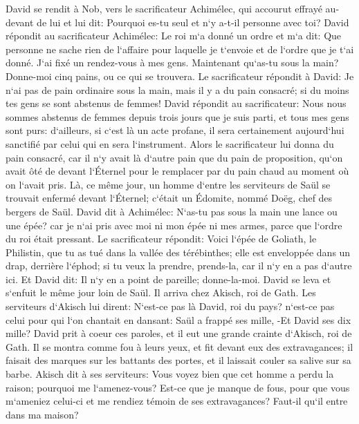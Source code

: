 \verse David se rendit à Nob, vers le sacrificateur Achimélec, qui accourut effrayé au-devant de lui et lui dit: Pourquoi es-tu seul et n`y a-t-il personne avec toi? 
\verse David répondit au sacrificateur Achimélec: Le roi m`a donné un ordre et m`a dit: Que personne ne sache rien de l`affaire pour laquelle je t`envoie et de l`ordre que je t`ai donné. J`ai fixé un rendez-vous à mes gens. 
\verse Maintenant qu`as-tu sous la main? Donne-moi cinq pains, ou ce qui se trouvera. 
\verse Le sacrificateur répondit à David: Je n`ai pas de pain ordinaire sous la main, mais il y a du pain consacré; si du moins tes gens se sont abstenus de femmes! 
\verse David répondit au sacrificateur: Nous nous sommes abstenus de femmes depuis trois jours que je suis parti, et tous mes gens sont purs: d`ailleurs, si c`est là un acte profane, il sera certainement aujourd`hui sanctifié par celui qui en sera l`instrument. 
\verse Alors le sacrificateur lui donna du pain consacré, car il n`y avait là d`autre pain que du pain de proposition, qu`on avait ôté de devant l`Éternel pour le remplacer par du pain chaud au moment où on l`avait pris. 
\verse Là, ce même jour, un homme d`entre les serviteurs de Saül se trouvait enfermé devant l`Éternel; c`était un Édomite, nommé Doëg, chef des bergers de Saül. 
\verse David dit à Achimélec: N`as-tu pas sous la main une lance ou une épée? car je n`ai pris avec moi ni mon épée ni mes armes, parce que l`ordre du roi était pressant. 
\verse Le sacrificateur répondit: Voici l`épée de Goliath, le Philistin, que tu as tué dans la vallée des térébinthes; elle est enveloppée dans un drap, derrière l`éphod; si tu veux la prendre, prends-la, car il n`y en a pas d`autre ici. Et David dit: Il n`y en a point de pareille; donne-la-moi. 
\verse David se leva et s`enfuit le même jour loin de Saül. Il arriva chez Akisch, roi de Gath. 
\verse Les serviteurs d`Akisch lui dirent: N`est-ce pas là David, roi du pays? n`est-ce pas celui pour qui l`on chantait en dansant: Saül a frappé ses mille, -Et David ses dix mille? 
\verse David prit à coeur ces paroles, et il eut une grande crainte d`Akisch, roi de Gath. 
\verse Il se montra comme fou à leurs yeux, et fit devant eux des extravagances; il faisait des marques sur les battants des portes, et il laissait couler sa salive sur sa barbe. 
\verse Akisch dit à ses serviteurs: Vous voyez bien que cet homme a perdu la raison; pourquoi me l`amenez-vous? 
\verse Est-ce que je manque de fous, pour que vous m`ameniez celui-ci et me rendiez témoin de ses extravagances? Faut-il qu`il entre dans ma maison? 


